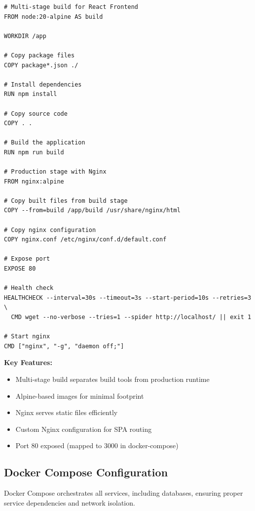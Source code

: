 \documentclass[12pt,a4paper]{article}
\begin{document}
\begin{lstlisting}[style=dockerfile, caption={React Frontend Dockerfile}, label={lst:react-dockerfile}]
# Multi-stage build for React Frontend
FROM node:20-alpine AS build

WORKDIR /app

# Copy package files
COPY package*.json ./

# Install dependencies
RUN npm install

# Copy source code
COPY . .

# Build the application
RUN npm run build

# Production stage with Nginx
FROM nginx:alpine

# Copy built files from build stage
COPY --from=build /app/build /usr/share/nginx/html

# Copy nginx configuration
COPY nginx.conf /etc/nginx/conf.d/default.conf

# Expose port
EXPOSE 80

# Health check
HEALTHCHECK --interval=30s --timeout=3s --start-period=10s --retries=3 \
  CMD wget --no-verbose --tries=1 --spider http://localhost/ || exit 1

# Start nginx
CMD ["nginx", "-g", "daemon off;"]
\end{lstlisting}

\textbf{Key Features:}
\begin{itemize}
    \item Multi-stage build separates build tools from production runtime
    \item Alpine-based images for minimal footprint
    \item Nginx serves static files efficiently
    \item Custom Nginx configuration for SPA routing
    \item Port 80 exposed (mapped to 3000 in docker-compose)
\end{itemize}

\subsection{Docker Compose Configuration}

Docker Compose orchestrates all services, including databases, ensuring proper service dependencies and network isolation.
\end{document}

